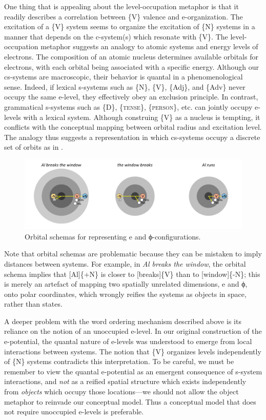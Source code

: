   One thing that is appealing about the level-occupation metaphor is that it readily describes a correlation between \{V\} valence and e-organization. The excitation of a \{V\} system seems to organize the excitation of \{N\} systems in a manner that depends on the c-system(s) which resonate with \{V\}. The level-occupation metaphor suggests an analogy to atomic systems and energy levels of electrons. The composition of an atomic nucleus determines available orbitals for electrons, with each orbital being associated with a specific energy. Although our cs-systems are macroscopic, their behavior is quantal in a phenomenological sense. Indeed, if lexical s-systems such as \{N\}, \{V\}, \{Adj\}, and \{Adv\} never occupy the same e-level, they effectively obey an exclusion principle. In contrast, grammatical s-systems such as \{D\}, \{\textsc{tense}\}, \{\textsc{person}\}, etc. can jointly occupy e-levels with a lexical system. Although construing \{V\} as a nucleus is tempting, it conflicts with the conceptual mapping between orbital radius and excitation level. The analogy thus suggests a representation in which cs-systems occupy a discrete set of orbits as in {}.

  
\begin{figure}
\includegraphics[width=\textwidth]{figures/Tilsen-img76.png}
\caption{Orbital schemas for representing e and ϕ-configurations.}
\label{fig:4:26}
\end{figure}
 

  Note that orbital schemas are problematic because they can be mistaken to imply distances between systems. For example, in \textit{Al breaks the window}, the orbital schema implies that [Al]\{+N\} is closer to [breaks]\{V\} than to [window]\{-N\}; this is merely an artefact of mapping two spatially unrelated dimensions, e and ϕ, onto polar coordinates, which wrongly reifies the systems as objects in space, rather than states.

  A deeper problem with the word ordering mechanism described above is its reliance on the notion of an unoccupied e-level. In our original construction of the e-potential, the quantal nature of e-levels was understood to emerge from local interactions between systems. The notion that \{V\} organizes levels independently of \{N\} systems contradicts this interpretation. To be careful, we must be remember to view the quantal e-potential as an emergent consequence of s-system interactions, and \textit{not} as a reified spatial structure which exists independently from \textit{objects} which occupy those locations—we should not allow the object metaphor to reinvade our conceptual model. Thus a conceptual model that does not require unoccupied e-levels is preferable.

